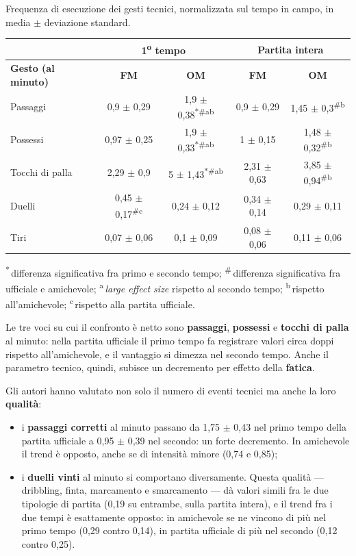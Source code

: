Frequenza di esecuzione dei gesti tecnici, normalizzata sul tempo in campo, in media $\pm$
deviazione standard.

\begin{center}
\footnotesize
\begin{tabular}{|l|c|c|c|c|}
\hline
 & \multicolumn{2}{c|}{\textbf{1\textsuperscript{o} tempo}} & \multicolumn{2}{c|}{\textbf{Partita intera}} \\
\hline
\textbf{Gesto (al minuto)} & \textbf{FM} & \textbf{OM} & \textbf{FM} & \textbf{OM} \\
\hline
Passaggi          & 0,9 $\pm$ 0,29  & 1,9 $\pm$ 0,38\textsuperscript{*\#ab} & 0,9 $\pm$ 0,29  & 1,45 $\pm$ 0,3\textsuperscript{\#b} \\
Possessi          & 0,97 $\pm$ 0,25 & 1,9 $\pm$ 0,33\textsuperscript{*\#ab} & 1 $\pm$ 0,15    & 1,48 $\pm$ 0,32\textsuperscript{\#b} \\
Tocchi di palla   & 2,29 $\pm$ 0,9  & 5 $\pm$ 1,43\textsuperscript{*\#ab}   & 2,31 $\pm$ 0,63 & 3,85 $\pm$ 0,94\textsuperscript{\#b} \\
Duelli            & 0,45 $\pm$ 0,17\textsuperscript{\#c} & 0,24 $\pm$ 0,12 & 0,34 $\pm$ 0,14 & 0,29 $\pm$ 0,11 \\
Tiri              & 0,07 $\pm$ 0,06 & 0,1 $\pm$ 0,09  & 0,08 $\pm$ 0,06 & 0,11 $\pm$ 0,06 \\
\hline
\end{tabular}
\end{center}
\footnotesize \textsuperscript{*}\,differenza significativa fra primo e secondo tempo;
\textsuperscript{\#}\,differenza significativa fra ufficiale e amichevole;
\textsuperscript{a}\,\textit{large effect size} rispetto al secondo tempo;
\textsuperscript{b}\,rispetto all'amichevole; \textsuperscript{c}\,rispetto alla partita ufficiale.
\normalsize

Le tre voci su cui il confronto è netto sono \textbf{passaggi}, \textbf{possessi} e \textbf{tocchi
di palla} al minuto: nella partita ufficiale il primo tempo fa registrare valori circa doppi
rispetto all'amichevole, e il vantaggio si dimezza nel secondo tempo. Anche il parametro tecnico,
quindi, subisce un decremento per effetto della \textbf{fatica}.

Gli autori hanno valutato non solo il numero di eventi tecnici ma anche la loro \textbf{qualità}:
\begin{itemize}
  \item i \textbf{passaggi corretti} al minuto passano da 1,75 $\pm$ 0,43 nel primo tempo della
    partita ufficiale a 0,95 $\pm$ 0,39 nel secondo: un forte decremento. In amichevole il trend è
    opposto, anche se di intensità minore (0,74 e 0,85);
  \item i \textbf{duelli vinti} al minuto si comportano diversamente. Questa qualità --- dribbling,
    finta, marcamento e smarcamento --- dà valori simili fra le due tipologie di partita (0,19 su
    entrambe, sulla partita intera), e il trend fra i due tempi è esattamente opposto: in amichevole
    se ne vincono di più nel primo tempo (0,29 contro 0,14), in partita ufficiale di più nel secondo
    (0,12 contro 0,25).
\end{itemize}

